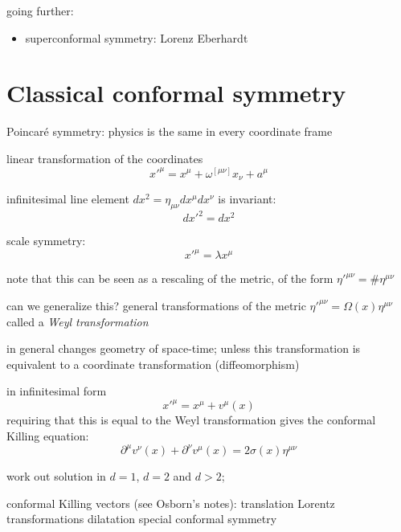 \documentclass[a4paper,12pt]{article}
\numberwithin{equation}{section}
\begin{document}
going further:
\begin{itemize}

\item
superconformal symmetry: Lorenz Eberhardt 
\cite{Eberhardt:2020cxo}

\end{itemize}



\section{Classical conformal symmetry}


Poincar\'e symmetry: physics is the same in every coordinate frame

linear transformation of the coordinates
\begin{equation}
	x'^\mu = x^\mu + \omega^{[\mu\nu]} x_\nu + a^\mu
\end{equation}


infinitesimal line element $dx^2 = \eta_{\mu\nu} dx^\mu dx^\nu$ is invariant:
\begin{equation}
	dx'^2 = dx^2
\end{equation}


scale symmetry:
\begin{equation}
	x'^\mu = \lambda x^\mu
\end{equation}

note that this can be seen as a rescaling of the metric, of the form
$\eta'^{\mu\nu} = \# \eta^{\mu\nu}$


can we generalize this? general transformations of the metric $\eta'^{\mu\nu} = \Omega(x) \eta^{\mu\nu}$
called a \emph{Weyl transformation}

in general changes geometry of space-time; unless this transformation is equivalent to a coordinate transformation (diffeomorphism)

in infinitesimal form
\begin{equation}
	x'^\mu = x^\mu + v^\mu(x)
\end{equation}
requiring that this is equal to the Weyl transformation gives the conformal Killing equation:
\begin{equation}
	\partial^\mu v^\nu(x) + \partial^\nu v^\mu(x)
	= 2 \sigma(x) \eta^{\mu\nu}
\end{equation}

work out solution in $d = 1$, $d = 2$ and $d > 2$;


conformal Killing vectors (see Osborn's notes):
translation
Lorentz transformations
dilatation
special conformal symmetry
\end{document}
